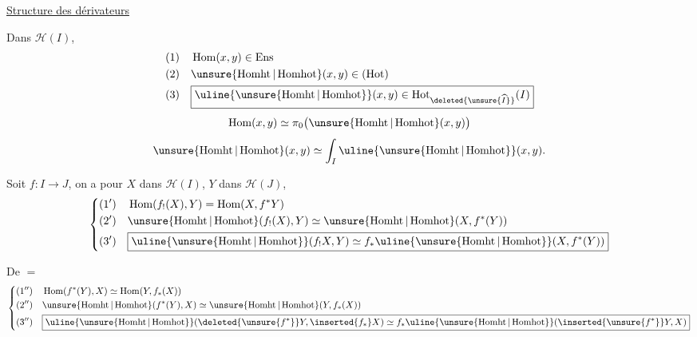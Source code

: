 \uline{Structure des dérivateurs}

Dans $\mathcal H(I)$,
\[
\begin{aligned}
(1)\quad&\operatorname{Hom}(x,y)\in\operatorname{Ens}\\
(2)\quad&\unsure{\operatorname{Homht}|\operatorname{Homhot}}(x,y)\in(\operatorname{Hot})\\
(3)\quad&\boxed{\uline{\unsure{\operatorname{Homht}|\operatorname{Homhot}}}(x,y)\in\operatorname{Hot}_{\deleted{\unsure{\widehat I}}}(I)}
\end{aligned}
\]
\[
\operatorname{Hom}(x,y)\simeq\pi_0\bigl(\unsure{\operatorname{Homht}|\operatorname{Homhot}}(x,y)\bigr)
\]
\[
\unsure{\operatorname{Homht}|\operatorname{Homhot}}(x,y)\simeq\int_I\uline{\unsure{\operatorname{Homht}|\operatorname{Homhot}}}(x,y).
\]
\margin{$\begin{gathered}-\\-\end{gathered}$}

Soit $f:I\longrightarrow J$, on a pour $X$ dans $\mathcal H(I)$, $Y$ dans $\mathcal H(J)$,
\[
\left\{\begin{aligned}
(1')\quad&\operatorname{Hom}(f_!(X),Y)=\operatorname{Hom}(X,f^*Y)\\
(2')\quad&\unsure{\operatorname{Homht}|\operatorname{Homhot}}(f_!(X),Y)\simeq\unsure{\operatorname{Homht}|\operatorname{Homhot}}(X,f^*(Y))\\
(3')\quad&\boxed{\uline{\unsure{\operatorname{Homht}|\operatorname{Homhot}}}(f_!X,Y)\simeq f_*\uline{\unsure{\operatorname{Homht}|\operatorname{Homhot}}}(X,f^*(Y))}
\end{aligned}\right.
\]

De $=$
\[
\left\{\begin{aligned}
(1'')\quad&\operatorname{Hom}(f^*(Y),X)\simeq\operatorname{Hom}(Y,f_*(X))\\
(2'')\quad&\unsure{\operatorname{Homht}|\operatorname{Homhot}}(f^*(Y),X)\simeq\unsure{\operatorname{Homht}|\operatorname{Homhot}}(Y,f_*(X))\\
(3'')\quad&\boxed{\uline{\unsure{\operatorname{Homht}|\operatorname{Homhot}}}(\deleted{\unsure{f^*}}Y,\inserted{f_*}X)\simeq f_*\uline{\unsure{\operatorname{Homht}|\operatorname{Homhot}}}(\inserted{\unsure{f^*}}Y,X)}
\end{aligned}\right.
\]

